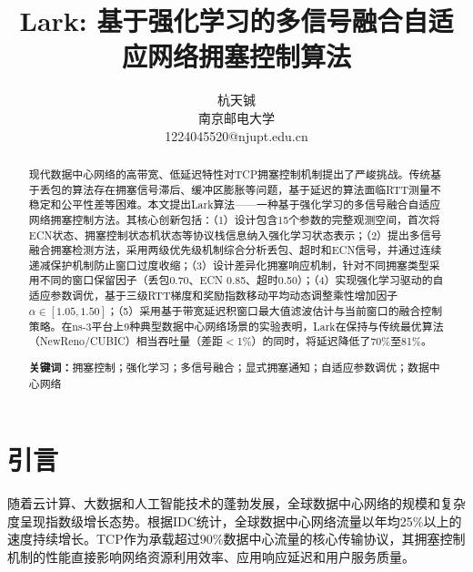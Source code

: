 \documentclass[10pt,twocolumn]{article}
\begin{document}

\title{\Large\textbf{Lark: 基于强化学习的多信号融合自适应网络拥塞控制算法}}

\author{
\normalsize 杭天铖 \\
\small 南京邮电大学 \\
\small 1224045520@njupt.edu.cn
}

\date{}

\maketitle


\begin{abstract}
\small
现代数据中心网络的高带宽、低延迟特性对TCP拥塞控制机制提出了严峻挑战。传统基于丢包的算法存在拥塞信号滞后、缓冲区膨胀等问题，基于延迟的算法面临RTT测量不稳定和公平性差等困难。本文提出Lark算法——一种基于强化学习的多信号融合自适应网络拥塞控制方法。其核心创新包括：（1）设计包含15个参数的完整观测空间，首次将ECN状态、拥塞控制状态机状态等协议栈信息纳入强化学习状态表示；（2）提出多信号融合拥塞检测方法，采用两级优先级机制综合分析丢包、超时和ECN信号，并通过连续递减保护机制防止窗口过度收缩；（3）设计差异化拥塞响应机制，针对不同拥塞类型采用不同的窗口保留因子（丢包0.70、ECN 0.85、超时0.50）；（4）实现强化学习驱动的自适应参数调优，基于三级RTT梯度和奖励指数移动平均动态调整乘性增加因子$\alpha \in [1.05, 1.50]$；（5）采用基于带宽延迟积窗口最大值滤波估计与当前窗口的融合控制策略。在ns-3平台上9种典型数据中心网络场景的实验表明，Lark在保持与传统最优算法（NewReno/CUBIC）相当吞吐量（差距$<$1\%）的同时，将延迟降低了70\%至81\%。

\vspace{0.3em}
\noindent\textbf{关键词：}拥塞控制；强化学习；多信号融合；显式拥塞通知；自适应参数调优；数据中心网络
\end{abstract}


\section{引言}

随着云计算、大数据和人工智能技术的蓬勃发展，全球数据中心网络的规模和复杂度呈现指数级增长态势。根据IDC统计，全球数据中心网络流量以年均25\%以上的速度持续增长\cite{idc2023}。TCP作为承载超过90\%数据中心流量的核心传输协议，其拥塞控制机制的性能直接影响网络资源利用效率、应用响应延迟和用户服务质量。
\end{document}
